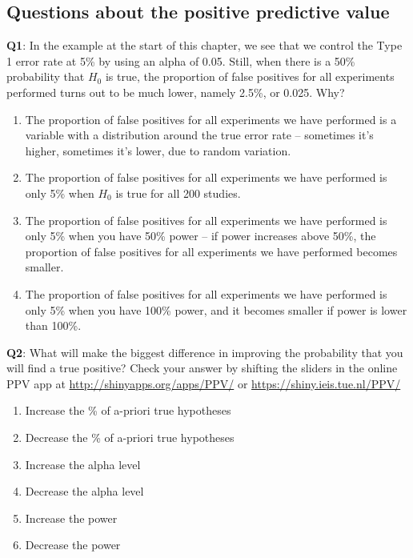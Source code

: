 \documentclass[
  oneside]{book}
\providecommand{\tightlist}{%
  \setlength{\itemsep}{0pt}\setlength{\parskip}{0pt}}
\begin{document}
\hypertarget{questions-about-the-positive-predictive-value}{%
\subsection{Questions about the positive predictive value}\label{questions-about-the-positive-predictive-value}}

\textbf{Q1}: In the example at the start of this chapter, we see that we control the Type 1 error rate at 5\% by using an alpha of 0.05. Still, when there is a 50\% probability that \(H_0\) is true, the proportion of false positives for all experiments performed turns out to be much lower, namely 2.5\%, or 0.025. Why?

\begin{enumerate}
\def\labelenumi{\Alph{enumi})}
\tightlist
\item
  The proportion of false positives for all experiments we have performed is a variable with a distribution around the true error rate -- sometimes it's higher, sometimes it's lower, due to random variation.
\item
  The proportion of false positives for all experiments we have performed is only 5\% when \(H_0\) is true for all 200 studies.
\item
  The proportion of false positives for all experiments we have performed is only 5\% when you have 50\% power -- if power increases above 50\%, the proportion of false positives for all experiments we have performed becomes smaller.
\item
  The proportion of false positives for all experiments we have performed is only 5\% when you have 100\% power, and it becomes smaller if power is lower than 100\%.
\end{enumerate}

\textbf{Q2}: What will make the biggest difference in improving the probability that you will find a true positive? Check your answer by shifting the sliders in the online PPV app at \url{http://shinyapps.org/apps/PPV/} or \url{https://shiny.ieis.tue.nl/PPV/}

\begin{enumerate}
\def\labelenumi{\Alph{enumi})}
\tightlist
\item
  Increase the \% of a-priori true hypotheses
\item
  Decrease the \% of a-priori true hypotheses
\item
  Increase the alpha level
\item
  Decrease the alpha level
\item
  Increase the power
\item
  Decrease the power
\end{enumerate}
\end{document}
